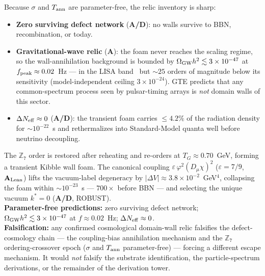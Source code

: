 \documentclass[11pt]{article}
\theoremstyle{remark}
\newcommand{\ZS}{\mathbb{Z}_7}
\newcommand{\CatA}{\textbf{A}}
\newcommand{\CatAL}{\ensuremath{\textbf{A}_{\rm Lean}}}
\newcommand{\CatAD}{\textbf{A/D}}
\begin{document}
Because $\sigma$ and $T_{\rm ann}$ are parameter-free, the relic inventory is
sharp:

\begin{itemize}[noitemsep,topsep=2pt]
  \item \textbf{Zero surviving defect network} (\CatAD): no walls survive to
        BBN, recombination, or today.
  \item \textbf{Gravitational-wave relic} (\CatA): the foam never reaches the
        scaling regime, so the wall-annihilation background is bounded by
        $\Omega_{\rm GW}h^2 \lesssim 3\times10^{-47}$ at
        $f_{\rm peak} \approx 0.02$~Hz --- in the LISA
        band~\cite{AmaroSeoane2017LISA} but $\sim\!25$ orders of magnitude
        below its sensitivity (model-independent ceiling
        $3\times10^{-24}$). GTE predicts that any common-spectrum process seen
        by pulsar-timing arrays is \emph{not} domain walls of this sector.
  \item \textbf{$\Delta N_{\rm eff} \approx 0$} (\CatAD): the transient foam
        carries $\le 4.2\%$ of the radiation density for $\sim\!10^{-22}$~s and
        rethermalizes into Standard-Model quanta well before neutrino
        decoupling.
\end{itemize}

\begin{tcolorbox}[colback=orange!8,colframe=orange!60!black,
  title={\textbf{Key Result: $\ZS$ Defect Cosmology}},
  fonttitle=\bfseries,left=6pt,right=6pt,top=5pt,bottom=5pt,breakable]
\small
The $\ZS$ order is restored after reheating and re-orders at
$T_G \approx 0.70$~GeV, forming a transient Kibble wall foam. The canonical
coupling $\varepsilon\,\varphi^2(D_\mu\chi)^2$ ($\varepsilon = 7/9$, \CatAL)
lifts the vacuum-label degeneracy by
$|\Delta V| \approx 3.8\times10^{-2}$~GeV$^4$, collapsing the foam within
$\sim\!10^{-23}$~s --- $700\times$ before BBN --- and selecting the unique
vacuum $k^* = 0$ (\CatAD, ROBUST).\\[3pt]
\textbf{Parameter-free predictions:} zero surviving defect network;
$\Omega_{\rm GW}h^2 \lesssim 3\times10^{-47}$ at $f \approx 0.02$~Hz;
$\Delta N_{\rm eff} \approx 0$.\\[3pt]
\textbf{Falsification:} any confirmed cosmological domain-wall relic falsifies
the defect-cosmology chain --- the coupling-bias annihilation mechanism and the
$\ZS$ ordering-crossover epoch ($\sigma$ and $T_{\rm ann}$ parameter-free) ---
forcing a different escape mechanism. It would \emph{not} falsify the substrate
identification, the particle-spectrum derivations, or the remainder of the
derivation tower.
\end{tcolorbox}
\end{document}

